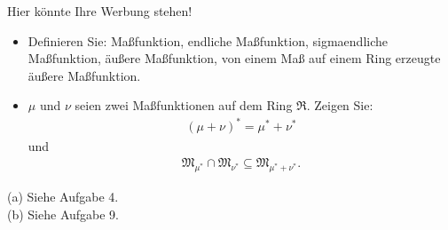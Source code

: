 \begin{exercise}

Hier könnte Ihre Werbung stehen!

\begin{itemize}
  \item[(a)] Definieren Sie: Maßfunktion, endliche Maßfunktion, sigmaendliche Maßfunktion, äußere Maßfunktion, von einem Maß auf einem Ring erzeugte äußere Maßfunktion.
  \item[(b)] $\mu$ und $\nu$ seien zwei Maßfunktionen auf dem Ring $\mathfrak{R}$. Zeigen Sie:
  \begin{align*}
    (\mu + \nu)^\ast = \mu^\ast + \nu^\ast
  \end{align*}
  und
  \begin{align*}
    \mathfrak{M}_{\mu^\ast} \cap \mathfrak{M}_{\nu^\ast}
    \subseteq
    \mathfrak{M}_{\mu^\ast + \nu^\ast}.
  \end{align*}
\end{itemize}

\end{exercise}


\begin{solution}

(a) Siehe Aufgabe 4. \\

(b) Siehe Aufgabe 9.

\end{solution}

